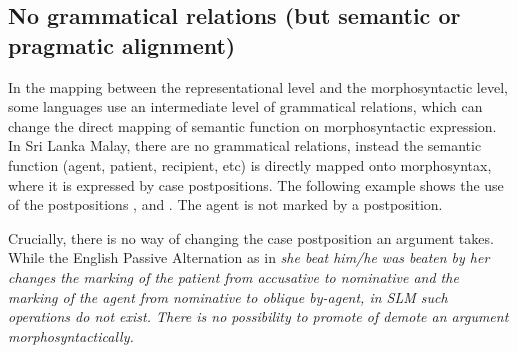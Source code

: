 \documentclass[a4paper]{article}
\begin{document}
\subsection{No grammatical relations (but semantic or pragmatic alignment)}
In the mapping between the representational level and the morphosyntactic level, some languages use an intermediate level of grammatical relations, which can change the direct mapping of semantic function on morphosyntactic expression. In Sri Lanka Malay, there are no grammatical relations, instead the semantic function (agent, patient, recipient, etc) is directly mapped onto morphosyntax, where it is expressed by case postpositions. The following example shows the use of the postpositions ,  and . The agent  is not marked by a postposition.


Crucially, there is no way of changing the case postposition an argument takes. While the English Passive Alternation  as in \em she beat him/he was beaten by her \em changes the marking of the patient from accusative to nominative and the marking of the agent from nominative to oblique \em by\em-agent, in SLM such operations do not exist. There is no possibility to promote of demote an argument morphosyntactically.
\end{document}

